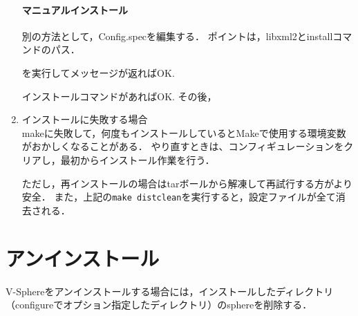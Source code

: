 \begin{enumerate}
%
\paragraph{マニュアルインストール}
別の方法として，Config.specを編集する．
ポイントは，libxml2とinstallコマンドのパス．
{\small
{}
}
を実行してメッセージが返ればOK.
{\small
{}
}
インストールコマンドがあればOK.
その後，
{\small
{}
}
\vspace{\baselineskip}

\item インストールに失敗する場合\\
makeに失敗して，何度もインストールしているとMakeで使用する環境変数がおかしくなることがある．
やり直すときは、コンフィギュレーションをクリアし，最初からインストール作業を行う．

{\small
{}
}

ただし，再インストールの場合はtarボールから解凍して再試行する方がより安全．
また，上記の\verb|make distclean|を実行すると，設定ファイルが全て消去される．

\end{enumerate}

\section{アンインストール}
V-Sphereをアンインストールする場合には，インストールしたディレクトリ（configureでオプション指定したディレクトリ）のsphereを削除する．
